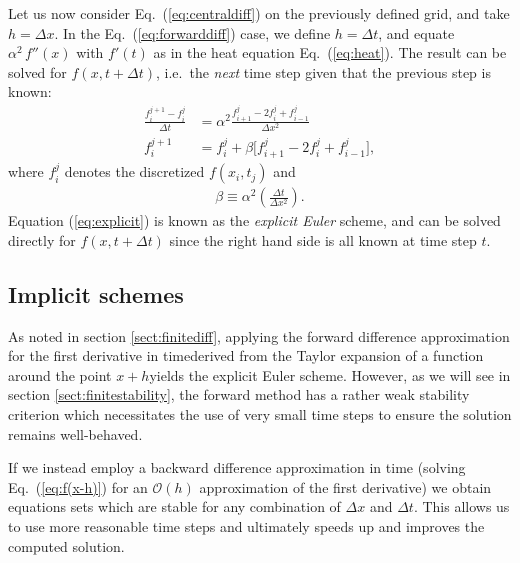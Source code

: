 \documentclass[a4paper, twocolumn]{article}
\newcommand{\eq} [1]{Eq.\ (\ref{eq:#1})}
\begin{document}
Let us now consider \eq{centraldiff} on the previously defined grid, and take $h=\Delta x$. In the \eq{forwarddiff} case, we define $h=\Delta t$, and equate $\alpha^2\,f''(x)$ with $f'(t)$ as in the heat equation \eq{heat}. The result can be solved for $f(x,t+\Delta t)$, i.e.\ the \textit{next} time step given that the previous step is known:
\begin{align}
\frac{f_i^{j+1} - f_i^j}{\Delta t} &= \alpha^2\frac{f_{i+1}^j - 2f_i^j + f_{i-1}^j}{\Delta x^2} \nonumber \\
%
f_i^{j+1} &= f_i^j + \beta \Big[f_{i+1}^j - 2f_i^j + f_{i-1}^j\Big], \label{eq:explicit}
\end{align}
where $f_i^j$ denotes the discretized $f(x_i,t_j)$ and 
\begin{align}
\beta\equiv\alpha^2\left(\frac{\Delta t}{\Delta x^2}\right).
\end{align}
Equation (\ref{eq:explicit}) is known as the \textit{explicit Euler} scheme, and can be solved directly for $f(x,t+\Delta t)$ since the right hand side is all known at time step $t$.


\subsection{Implicit schemes}
As noted in section \ref{sect:finitediff}, applying the forward difference approximation for the first derivative in time\textemdash derived from the Taylor expansion of a function around the point $x+h$\textemdash yields the explicit Euler scheme. However, as we will see in section \ref{sect:finitestability}, the forward method has a rather weak stability criterion which necessitates the use of very small time steps to ensure the solution remains well-behaved. 

If we instead employ a backward difference approximation in time (solving \eq{f(x-h)} for an $\mathcal{O}(h)$ approximation of the first derivative) we obtain equations sets which are stable for any combination of $\Delta x$ and $\Delta t$. This allows us to use more reasonable time steps and ultimately speeds up and improves the computed solution. 
\end{document}
